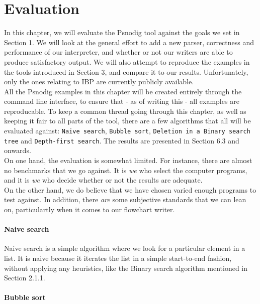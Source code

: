 \chapter{Evaluation}

In this chapter, we will evaluate the Psnodig tool against the goals we set in Section 1. We will look at the general effort to add a new parser, correctness and performance of our interpreter, and whether or not our writers are able to produce satisfactory output. We will also attempt to reproduce the examples in the tools introduced in Section 3, and compare it to our results. Unfortunately, only the ones relating to IBP are currently publicly available. \\

All the Psnodig examples in this chapter will be created entirely through the command line interface, to ensure that - as of writing this - all examples are reproducable. To keep a common thread going through this chapter, as well as keeping it fair to all parts of the tool, there are a few algorithms that all will be evaluated against: \texttt{Naive search}, \texttt{Bubble sort}, \texttt{Deletion in a Binary search tree} and \texttt{Depth-first search}. The results are presented in Section 6.3 and onwards. \\

On one hand, the evaluation is somewhat limited. For instance, there are almost no benchmarks that we go against. It is \textit{we} who select the computer programs, and it is \textit{we} who decide whether or not the results are adequate. \\

On the other hand, we do believe that we have chosen varied enough programs to test against. In addition, there \textit{are} some subjective standards that we can lean on, particulartly when it comes to our flowchart writer.

\subsubsection{Naive search}

Naive search is a simple algorithm where we look for a particular element in a list. It is naive because it iterates the list in a simple start-to-end fashion, without applying any heuristics, like the Binary search algorithm mentioned in Section 2.1.1.

\subsubsection{Bubble sort}

